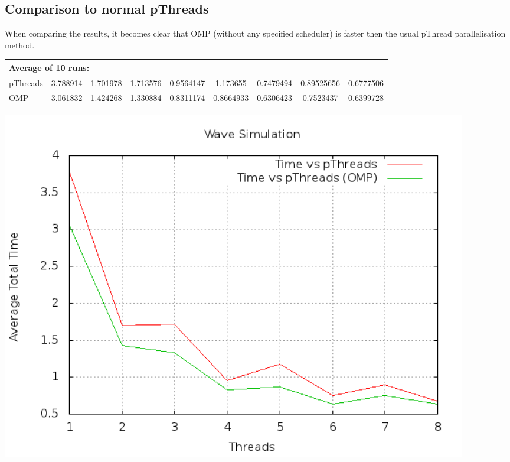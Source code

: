 \documentclass[a4paper]{article}
\begin{document}
    
  \subsection{Comparison to normal pThreads}
    When comparing the results, it becomes clear that OMP (without any specified scheduler) is faster then the usual pThread parallelisation method.\\
    \begin{tabular}{| l | c | c | c | c | c | c | c | c |}
      \hline
      \multicolumn{9}{|l|}{Average of 10 runs:}\\
      \hline
      pThreads & 3.788914 & 1.701978 & 1.713576 & 0.9564147 & 1.173655 & 0.7479494 & 0.89525656 & 0.6777506\\
      \hline
      OMP & 3.061832 & 1.424268 & 1.330884 & 0.8311174 & 0.8664933 & 0.6306423 & 0.7523437 & 0.6399728\\
      \hline
    \end{tabular}
    \begin{center}
      \includegraphics[width=0.9\textwidth]{speedplot.png}
    \end{center}
    
\end{document}
